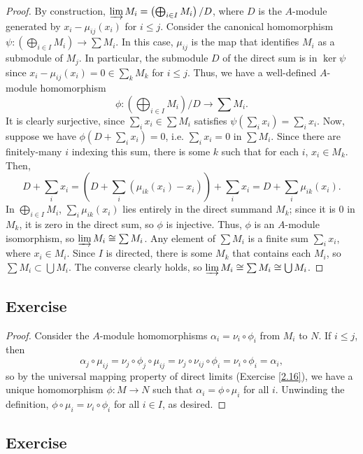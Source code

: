 \begin{proof}
By construction, $\varinjlim M_i = \left(\bigoplus_{i\in I} M_i\right)/D$, where $D$ is the $A$-module generated by $x_i - \mu_{ij}(x_i)$ for $i \le j$. Consider the canonical homomorphism
$\psi : \left(\bigoplus_{i\in I} M_i\right) \to \sum M_i$. In this case, $\mu_{ij}$ is the map that identifies $M_i$ as a submodule of $M_j$. In particular, the submodule $D$ of the direct sum 
is in $\ker\psi$ since $x_i - \mu_{ij}(x_i) = 0 \in \sum_k M_k$ for $i \le j$. Thus, we have a well-defined $A$-module homomorphism
$$\phi : \left(\bigoplus_{i\in I} M_i\right)/D \to \sum M_i.$$
It is clearly surjective, since $\sum_i x_i \in \sum M_i$ satisfies $\psi\left(\sum_i x_i\right) = \sum_i x_i$. Now, suppose we have $\phi\left(D + \sum_i x_i\right) = 0$, i.e. $\sum_i x_i = 0$ in $\sum M_i$.
Since there are finitely-many $i$ indexing this sum, there is some $k$ such that for each $i$, $x_i \in M_k$. Then,
$$D + \sum_i x_i = \left(D + \sum_i(\mu_{ik}(x_i) - x_i)\right) + \sum_i x_i = D + \sum_i\mu_{ik}(x_i).$$
In $\bigoplus_{i \in I}M_i$, $\sum_i\mu_{ik}(x_i)$ lies entirely in the direct summand $M_k$; since it is $0$ in $M_k$, it is zero in the direct sum, so $\phi$ is injective. Thus, $\phi$ is an
$A$-module isomorphism, so $\varinjlim M_i \cong \sum M_i$. Any element of $\sum M_i$ is a finite sum $\sum_i x_i$, where $x_i \in M_i$. Since $I$ is directed, there is some $M_k$ that contains each $M_i$, 
so $\sum M_i \subset \bigcup M_i$. The converse clearly holds, so $\varinjlim M_i \cong \sum M_i \cong \bigcup M_i$.
\end{proof}

\subsection{Exercise}\label{2.18} %

\begin{proof}
Consider the $A$-module homomorphisms $\alpha_i = \nu_i \circ \phi_i$ from $M_i$ to $N$. If $i \le j$, then
$$\alpha_j \circ \mu_{ij} = \nu_j \circ \phi_j \circ \mu_{ij} = \nu_j \circ \nu_{ij} \circ \phi_i = \nu_i \circ \phi_i = \alpha_i,$$
so by the universal mapping property of direct limits (Exercise \ref{2.16}), we have a unique homomorphism $\phi : M \to N$ such that $\alpha_i = \phi \circ \mu_i$
for all $i$. Unwinding the definition, $\phi \circ \mu_i = \nu_i \circ \phi_i$ for all $i \in I$, as desired.
\end{proof}

\subsection{Exercise}\label{2.19} %


